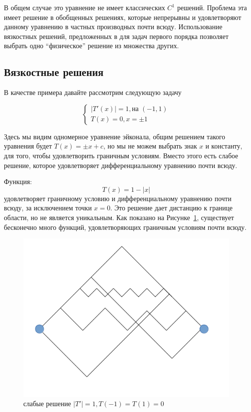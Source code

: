 В общем случае это уравнение не имеет классических $C^1$
решений. Проблема эта имеет решение в обобщенных решениях, которые
непрерывны и удовлетворяют данному уравнению в частных производных
почти всюду. Использование вязкостных  решений, предложенных в
\cite{V1984,V1983} для задач первого порядка позволяет выбрать одно
``физическое'' решение из множества других. 

\subsection{Вязкостные решения}

В качестве примера давайте рассмотрим следующую задачу

\begin{equation}
  \label{eq:visc_sample}
  \left\{ \begin{matrix}
      |T'(x)| = 1,\text{на } (-1,1) \\
      T(x) = 0,x = \pm 1
    \end{matrix}\right.
\end{equation}

Здесь мы видим одномерное уравнение эйконала, общим решением такого
уравнения будет $T(x) = \pm x + c$, но мы не можем выбрать знак $x$ и
константу, для того, чтобы удовлетворить граничным условиям. Вместо
этого есть слабое решение, которое удовлетворяет дифференциальному
уравнению почти всюду.

Функция:
\begin{equation*}
  T(x) = 1 - |x|
\end{equation*}
удовлетворяет граничному условию и дифференциальному уравнению почти
всюду, за исключением точки $x = 0$. Это решение дает дистанцию к
границе области, но не является уникальным. Как показано на
Рисунке~\ref{fig:weak-sol}, существует бесконечно много функций,
удовлетворяющих граничным условиям почти всюду.

\begin{figure}[h]
  \centering
  \includegraphics[width=0.5\linewidth]{img/weak-sol.png}
  \hfil \caption{слабые решение $|T'|=1,T(-1)=T(1)=0$}
  \label{fig:weak-sol}

\end{figure}

